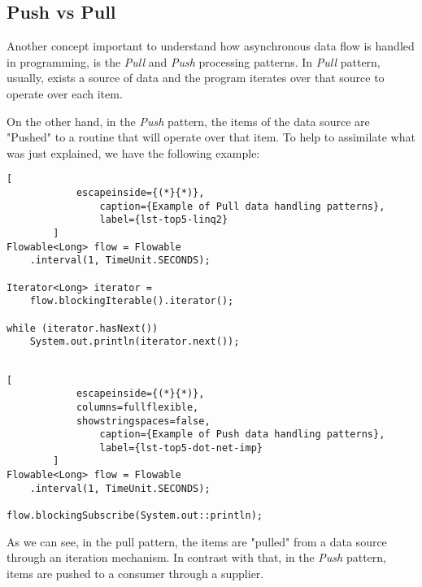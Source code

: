 	\subsection{Push vs Pull}
	Another concept important to understand how asynchronous data flow is handled in programming, is the \textit{Pull} and \textit{Push} processing patterns.
	In \textit{Pull} pattern, usually, exists a source of data and the program iterates over that source to operate over each item. 
	
	On the other hand, in the \textit{Push} pattern, the items of the data source are "Pushed" to a routine that will operate over that item.
	To help to assimilate what was just explained, we have the following example:


	\begin{center}
		\lstset{basicstyle=\scriptsize\ttfamily,frame=bottomline}
		\begin{minipage}{.48\textwidth}
		\begin{lstlisting}[
			escapeinside={(*}{*)},
				caption={Example of Pull data handling patterns},
				label={lst-top5-linq2}
		]
Flowable<Long> flow = Flowable
	.interval(1, TimeUnit.SECONDS);

Iterator<Long> iterator = 
	flow.blockingIterable().iterator();

while (iterator.hasNext()) 
	System.out.println(iterator.next());
		
		\end{lstlisting}
		\end{minipage}
		\hfill
		\begin{minipage}{.48\textwidth}
		\lstset{basicstyle=\scriptsize\ttfamily,frame=bottomline}
		\begin{lstlisting}[
			escapeinside={(*}{*)},
			columns=fullflexible,
			showstringspaces=false,
				caption={Example of Push data handling patterns},
				label={lst-top5-dot-net-imp}
		]
Flowable<Long> flow = Flowable
	.interval(1, TimeUnit.SECONDS);

flow.blockingSubscribe(System.out::println);

		\end{lstlisting}
		\end{minipage}
	\end{center}


	As we can see, in the pull pattern, the items are "pulled" from a data source through an iteration mechanism. 
	In contrast with that, in the \textit{Push} pattern, items are pushed to a consumer through a supplier.

